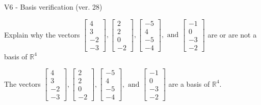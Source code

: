 \begin{exercise}
  \begin{exerciseTitle}V6 - Basis verification (ver. 28)\end{exerciseTitle}
  \begin{exerciseStatement}
    Explain why the vectors \(\left[\begin{array}{r}
4 \\
3 \\
-2 \\
-3
\end{array}\right] , \left[\begin{array}{r}
2 \\
2 \\
0 \\
-2
\end{array}\right] , \left[\begin{array}{r}
-5 \\
4 \\
-5 \\
-4
\end{array}\right] , \text{ and } \left[\begin{array}{r}
-1 \\
0 \\
-3 \\
-2
\end{array}\right]\) are or are not a basis of \(\mathbb{R}^4\)	


  \end{exerciseStatement}
  \begin{exerciseAnswer}
   The vectors \(\left[\begin{array}{r}
4 \\
3 \\
-2 \\
-3
\end{array}\right] , \left[\begin{array}{r}
2 \\
2 \\
0 \\
-2
\end{array}\right] , \left[\begin{array}{r}
-5 \\
4 \\
-5 \\
-4
\end{array}\right] , \text{ and } \left[\begin{array}{r}
-1 \\
0 \\
-3 \\
-2
\end{array}\right]\) 
  	 are  a basis of \(\mathbb{R}^4\).
  


  \end{exerciseAnswer}
\end{exercise}